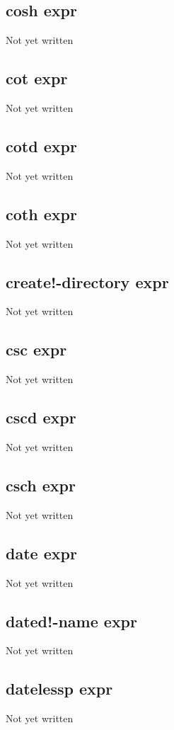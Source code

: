 \documentclass[a4paper,11pt]{article}
\begin{document}
\subsection{\ttfamily cosh expr}
Not yet written

\subsection{\ttfamily cot expr}
Not yet written

\subsection{\ttfamily cotd expr}
Not yet written

\subsection{\ttfamily coth expr}
Not yet written

\subsection{\ttfamily create!-directory expr}
Not yet written

\subsection{\ttfamily csc expr}
Not yet written

\subsection{\ttfamily cscd expr}
Not yet written

\subsection{\ttfamily csch expr}
Not yet written

\subsection{\ttfamily date expr}
Not yet written

\subsection{\ttfamily dated!-name expr}
Not yet written

\subsection{\ttfamily datelessp expr}
Not yet written
\end{document}
